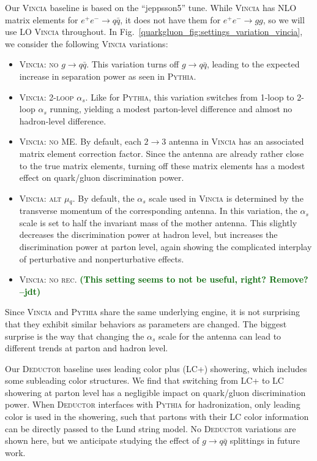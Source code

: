 \documentclass[11pt]{cernrep}
\newcommand{\jdt}[1]{\textbf{\textcolor{darkgreen}{(#1 --jdt)}}}
\begin{document}
Our \textsc{Vincia} baseline is based on the ``jeppsson5'' tune.  While \textsc{Vincia} has NLO matrix elements for $e^+ e^- \to q \bar{q}$, it does not have them for $e^+ e^- \to gg$, so we will use LO \textsc{Vincia} throughout.  In Fig.~\ref{quarkgluon_fig:settings_variation_vincia}, we consider the following \textsc{Vincia} variations:
\begin{itemize}
\item \textsc{Vincia:  no $g \to q\bar{q}$}.  This variation turns off $g \to q \bar{q}$, leading to the expected increase in separation power as seen in \textsc{Pythia}.
\item \textsc{Vincia: 2-loop $\alpha_s$}.  Like for \textsc{Pythia}, this variation switches from 1-loop to 2-loop $\alpha_s$ running, yielding a modest parton-level difference and almost no hadron-level difference. 
\item \textsc{Vincia: no ME}.  By default, each $2 \to 3$ antenna in \textsc{Vincia} has an associated matrix element correction factor.  Since the antenna are already rather close to the true matrix elements, turning off these matrix elements has a modest effect on quark/gluon discrimination power.
\item \textsc{Vincia: alt $\mu_q$}.  By default, the $\alpha_s$ scale used in \textsc{Vincia} is determined by the transverse momentum of the corresponding antenna.  In this variation, the $\alpha_s$ scale is set to half the invariant mass of the mother antenna.  This slightly decreases the discrimination power at hadron level, but increases the discrimination power at parton level, again showing the complicated interplay of perturbative and nonperturbative effects.
\item \textsc{Vincia: no rec}.   \jdt{This setting seems to not be useful, right? Remove?}
\end{itemize}
Since \textsc{Vincia} and \textsc{Pythia} share the same underlying engine, it is not surprising that they exhibit similar behaviors as parameters are changed.  The biggest surprise is the way that changing the $\alpha_s$ scale for the antenna can lead to different trends at parton and hadron level.

Our \textsc{Deductor} baseline uses leading color plus (LC+) showering, which includes some subleading color structures. We find that switching from LC+ to LC showering at parton level has a negligible impact on quark/gluon discrimination power.  When \textsc{Deductor} interfaces with \textsc{Pythia} for hadronization, only leading color is used in the showering, such that partons with their LC color information can be directly passed to the Lund string model.  No  \textsc{Deductor} variations are shown here, but we anticipate studying the effect of $g \to q \bar{q}$ splittings in future work.
\end{document}
